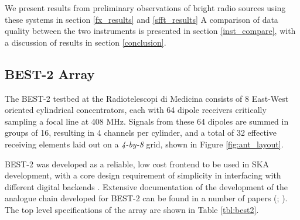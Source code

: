 \documentclass[useAMS,macros,usenatbib]{mn2e}
\begin{document}
We present results from preliminary observations of bright radio sources using these systems in section \ref{fx_results} and \ref{sfft_results}
A comparison of data quality between the two instruments is presented in section \ref{inst_compare}, with a discussion of results in section \ref{conclusion}.

\subsection{BEST-2 Array}
\label{best-2 array}

The BEST-2 testbed at the Radiotelescopi di Medicina consists of 8 East-West oriented cylindrical concentrators, each with 64 dipole receivers critically sampling a focal line at 408 MHz.
Signals from these 64 dipoles are summed in groups of 16, resulting in 4 channels per cylinder, and a total of 32 effective receiving elements laid out on a \emph{4-by-8} grid, shown in Figure \ref{fig:ant_layout}.

BEST-2 was developed as a reliable, low cost frontend to be used in SKA development, with a core design requirement of simplicity in interfacing with different digital backends \citep{best2}.
Extensive documentation of the development of the analogue chain developed for BEST-2 can be found in a number of papers (\cite{best2-lna}; \cite{best2-rec}). The top level specifications of the array are shown in Table \ref{tbl:best2}.

\end{document}
